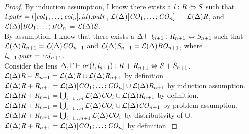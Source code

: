 \begin{lemma}
\begin{proof}
By induction assumption, I know
there exists a $\mathit{l} : \mathit{R} \Leftrightarrow \mathit{S}$ such that
$\mathit{l}.putr = ([\mathit{col}_1 ; \ldots ; \mathit{col}_n],id).putr$,
$\mathcal{L}(\Delta){[\mathit{CO}_1 ; \ldots ; \mathit{CO}_n]}$ =
$\mathcal{L}(\Delta){\mathit{R}}$,
and $\mathcal{L}(\Delta){[\mathit{BO}_1 ; \ldots ; \mathit{BO}_n}$ = $\mathcal{L}(\Delta){\mathit{S}}$.\\
By assumption, I know that there exists a $\Delta \vdash \mathit{l}_{n+1} : \mathit{R}_{n+1} \Leftrightarrow \mathit{S}_{n+1}$ such that $\mathcal{L}(\Delta){\mathit{R}_{n+1}}=\mathcal{L}(\Delta){\mathit{CO}_{n+1}}$
and $\mathcal{L}(\Delta){\mathit{S}_{n+1}}=\mathcal{L}(\Delta){\mathit{BO}_{n+1}}$, where $\mathit{l}_{n+1}.putr=\mathit{col}_{n+1}$.\\
Consider the lens $\Delta, \Gamma \vdash \mathit{or}(\mathit{l},\mathit{l}_{n+1}) : \mathit{R}+\mathit{R}_{n+1} \Leftrightarrow \mathit{S}+\mathit{S}_{n+1}$.\\
$\mathcal{L}(\Delta){\mathit{R}+\mathit{R}_{n+1}}
= \mathcal{L}(\Delta){\mathit{R}}\cup\mathcal{L}(\Delta){\mathit{R}_{n+1}}$
by definition\\
$\mathcal{L}(\Delta){\mathit{R}+\mathit{R}_{n+1}}
= \mathcal{L}(\Delta){[\mathit{CO}_1; \ldots ; \mathit{CO}_n]}
\cup\mathcal{L}(\Delta){\mathit{R}_{n+1}}$ by induction assumption.\\
$\mathcal{L}(\Delta){\mathit{R}+\mathit{R}_{n+1}}
= \bigcup_{i=1\ldots n}\mathcal{L}(\Delta){\mathit{CO}_i}
\cup\mathcal{L}(\Delta){\mathit{R}_{n+1}}$ by definition.\\
$\mathcal{L}(\Delta){\mathit{R}+\mathit{R}_{n+1}}
= \bigcup_{i=1\ldots n}\mathcal{L}(\Delta){\mathit{CO}_i}
\cup\mathcal{L}(\Delta){\mathit{CO}_{n+1}}$ by problem assumption.\\
$\mathcal{L}(\Delta){\mathit{R}+\mathit{R}_{n+1}}
= \bigcup_{i=1\ldots n+1}\mathcal{L}(\Delta){\mathit{CO}_i}$ by distributivity of $\cup$.\\
$\mathcal{L}(\Delta){\mathit{R}+\mathit{R}_{n+1}}
= \mathcal{L}(\Delta){[\mathit{CO}_1; \ldots ; \mathit{CO}_n]}$ by definition.


\end{proof}
\end{lemma}
